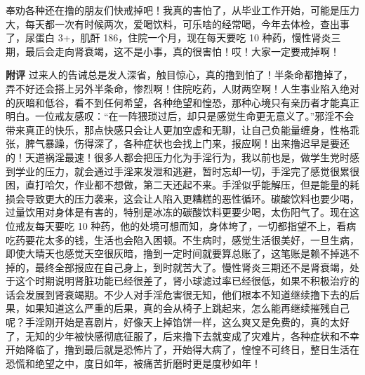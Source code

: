 \begin{case}
    奉劝各种还在撸的朋友们快戒掉吧！我真的害怕了，从毕业工作开始，可能是压力大，每天都一次有时候两次，爱喝饮料，可乐啥的经常喝，今年去体检，查出事了，尿蛋白 3+，肌酐 186，住院一个月，现在每天要吃 10 种药，慢性肾炎三期，最后会走向肾衰竭，这不是小事，真的很害怕！哎！大家一定要戒掉啊！

    \textbf{附评} 过来人的告诫总是发人深省，触目惊心，真的撸到怕了！半条命都撸掉了，弄不好还会搭上另外半条命，惨烈啊！住院吃药，人财两空啊！人生事业陷入绝对的灰暗和低谷，看不到任何希望，各种绝望和惶恐，那种心境只有亲历者才能真正明白。一位戒友感叹：“在一阵猥琐过后，却只是感觉生命更无意义了。”邪淫不会带来真正的快乐，那点快感只会让人更加空虚和无聊，让自己负能量缠身，性格乖张，脾气暴躁，伤得深了，各种症状也会找上门来，报应啊！出来撸迟早是要还的！天道祸淫最速！很多人都会把压力化为手淫行为，我以前也是，做学生党时感到学业的压力，就会通过手淫来发泄和逃避，暂时忘却一切，手淫完了感觉很累很困，直打哈欠，作业都不想做，第二天还起不来。手淫似乎能解压，但是能量的耗损会导致更大的压力袭来，这会让人陷入更糟糕的恶性循环。碳酸饮料也要少喝，过量饮用对身体是有害的，特别是冰冻的碳酸饮料更要少喝，太伤阳气了。现在这位戒友每天要吃 10 种药，他的处境可想而知，身体垮了，一切都指望不上，看病吃药要花太多的钱，生活也会陷入困顿。不生病时，感觉生活很美好，一旦生病，即使大晴天也感觉天空很灰暗，撸到一定时间就要算总账了，这笔账是赖不掉逃不掉的，最终全部报应在自己身上，到时就苦大了。慢性肾炎三期还不是肾衰竭，处于这个时期说明肾脏功能已经很差了，肾小球滤过率已经很低，如果不积极治疗的话会发展到肾衰竭期。不少人对手淫危害很无知，他们根本不知道继续撸下去的后果，如果知道这么严重的后果，真的会从椅子上跳起来，怎么能再继续摧残自己呢？手淫刚开始是喜剧片，好像天上掉馅饼一样，这么爽又是免费的，真的太好了，无知的少年被快感彻底征服了，后来撸下去就变成了灾难片，各种症状和不幸开始降临了，撸到最后就是恐怖片了，开始得大病了，惶惶不可终日，整日生活在恐慌和绝望之中，度日如年，被痛苦折磨时更是度秒如年！


\end{case}

